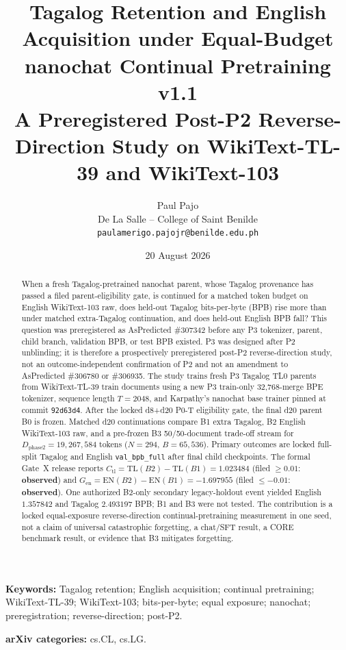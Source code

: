 \documentclass[11pt,a4paper]{article}
\title{Tagalog Retention and English Acquisition under Equal-Budget nanochat Continual Pretraining v1.1\\
\large A Preregistered Post-P2 Reverse-Direction Study on WikiText-TL-39 and WikiText-103}
\author{Paul Pajo\\
De La Salle -- College of Saint Benilde\\
\texttt{paulamerigo.pajojr@benilde.edu.ph}}
\date{20 August 2026}
\begin{document}
\maketitle

\begin{abstract}
When a fresh Tagalog-pretrained nanochat parent, whose Tagalog provenance has passed a filed parent-eligibility gate, is continued for a matched token budget on English WikiText-103 raw, does held-out Tagalog bits-per-byte (BPB) rise more than under matched extra-Tagalog continuation, and does held-out English BPB fall? This question was preregistered as AsPredicted \#307342 before any P3 tokenizer, parent, child branch, validation BPB, or test BPB existed. P3 was designed after P2 unblinding; it is therefore a prospectively preregistered post-P2 reverse-direction study, not an outcome-independent confirmation of P2 and not an amendment to AsPredicted \#306780 or \#306935. The study trains fresh P3 Tagalog TL0 parents from WikiText-TL-39 train documents using a new P3 train-only 32{,}768-merge BPE tokenizer, sequence length $T=2048$, and Karpathy's nanochat base trainer pinned at commit \texttt{92d63d4}. After the locked d8+d20 P0-T eligibility gate, the final d20 parent B0 is frozen. Matched d20 continuations compare B1 extra Tagalog, B2 English WikiText-103 raw, and a pre-frozen B3 50/50-document trade-off stream for $D_{\mathrm{phase2}}=19{,}267{,}584$ tokens ($N=294$, $B=65{,}536$). Primary outcomes are locked full-split Tagalog and English \texttt{val\_bpb\_full} after final child checkpoints. The formal Gate~X release reports $C_{\mathrm{tl}}=\mathrm{TL}(B2)-\mathrm{TL}(B1)=1.023484$ (filed $\ge 0.01$: \textbf{observed}) and $G_{\mathrm{en}}=\mathrm{EN}(B2)-\mathrm{EN}(B1)=-1.697955$ (filed $\le -0.01$: \textbf{observed}). One authorized B2-only secondary legacy-holdout event yielded English $1.357842$ and Tagalog $2.493197$ BPB; B1 and B3 were not tested. The contribution is a locked equal-exposure reverse-direction continual-pretraining measurement in one seed, not a claim of universal catastrophic forgetting, a chat/SFT result, a CORE benchmark result, or evidence that B3 mitigates forgetting.
\end{abstract}

\noindent\textbf{Keywords:} Tagalog retention; English acquisition; continual pretraining; WikiText-TL-39; WikiText-103; bits-per-byte; equal exposure; nanochat; preregistration; reverse-direction; post-P2.

\noindent\textbf{arXiv categories:} cs.CL, cs.LG.
\end{document}
